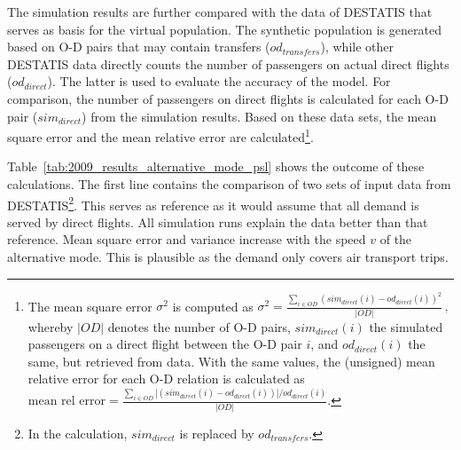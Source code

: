 The simulation results are further compared with the data of DESTATIS that serves as basis for the virtual population.  
The synthetic population is generated based on O-D pairs that may contain transfers ($od_{transfers}$), 
while other DESTATIS data directly counts the number of passengers on actual direct flights ($od_{direct}$). %
The latter is used to evaluate the accuracy of the model.
For comparison, the number of passengers on direct flights is calculated for each O-D pair ($sim_{direct}$) from the simulation results.
Based on these data sets, the mean square error and the mean relative error are calculated\footnote{
The mean square error $\sigma^2$ is computed as
	$\sigma^2 = \frac{\sum_{i \in OD} (sim_{direct}(i) - od_{direct}(i))^2}{|OD|} \, , $
whereby $|OD|$ denotes the number of O-D pairs, $sim_{direct}(i)$ the simulated passengers on a direct flight between the O-D pair $i$, and $od_{direct}(i)$ the same, but retrieved from data.  
With the same values, the (unsigned) mean relative error for each O-D relation is calculated as
$
\mbox{mean rel error} = \frac{\sum_{i \in OD} |(sim_{direct}(i) - od_{direct}(i))|/ od_{direct}(i)}{|OD|}.
$
}. 

Table~\ref{tab:2009_results_alternative_mode_psl} shows the outcome of these calculations. 
The first line contains the comparison of two sets of input data from DESTATIS\footnote{In the calculation, $sim_{direct}$ is replaced by $od_{transfers}$.}. 
This serves as reference as it would assume that all demand is served by direct flights.
All simulation runs explain the data better than that reference.
Mean square error and variance increase with the speed $v$ of the alternative mode.  
This is plausible as the demand only covers air transport trips. 

